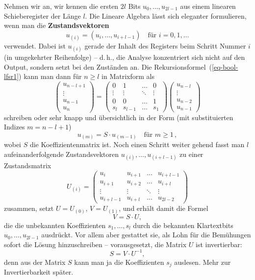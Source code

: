 \begin{refsegment}
Nehmen wir an, wir kennen die ersten $2l$ Bits $u_0, \ldots, u_{2l-1}$
aus einem linearen Schieberegister
der Länge $l$. Die Lineare Algebra lässt
sich eleganter formulieren, wenn man die \textbf{Zustandsvektoren}
\[
     u_{(i)} = (u_i, \ldots, u_{i+l-1}) \quad \text{für } i = 0, 1, \ldots
\]
verwendet. Dabei ist $u_{(i)}$ gerade der Inhalt des Registers beim Schritt
Nummer $i$ (in umgekehrter Reihenfolge) -- d.\,h., die Analyse konzentriert
sich nicht auf den Output, sondern setzt bei den Zuständen an. Die
Rekursionsformel~(\ref{eq-bool-lfsr1}) kann man dann für $n \geq l$ in
Matrixform als
\[
     \begin{pmatrix} u_{n-l+1} \\ \vdots \\ u_{n-1} \\ u_{n} \end{pmatrix}
     =
     \begin{pmatrix} 0      & 1      & \ldots & 0      \\
                     \vdots & \vdots & \ddots & \vdots \\
                     0      & 0      & \ldots & 1      \\
                     s_l    & s_{l-1}    & \ldots & s_1 \end{pmatrix}
     \begin{pmatrix} u_{n-l} \\ \vdots \\ u_{n-2} \\ u_{n-1} \end{pmatrix}
\]
schreiben oder sehr knapp und übersichtlich in der Form (mit substituierten Indizes
$m = n-l+1$)
\[
     u_{(m)} = S \cdot u_{(m-1)} \quad \text{für } m \geq 1\,,
\]
wobei $S$ die Koeffizientenmatrix ist. Noch einen Schritt weiter gehend
fasst man $l$ aufeinanderfolgende Zustandsvektoren
$u_{(i)}, \ldots, u_{(i+l-1)}$ zu einer Zustandsmatrix
\[
     U_{(i)} = \begin{pmatrix} u_i      & u_{i+1}      & \ldots & u_{i+l-1}      \\
                               u_{i+1} & u_{i+2} & \ldots & u_{i+l} \\
                               \vdots  & \vdots & \ddots & \vdots     \\
                     u_{i+l-1}    & u_{i+l} & \ldots & u_{2l-2} \end{pmatrix}
\]
zusammen, setzt $U = U_{(0)}$, $V = U_{(1)}$, und erhält damit die Formel
\[
     V  =  S \cdot U,
\]
die die unbekannten Koeffizienten $s_1, \ldots, s_l$ durch die bekannten
Klartextbits $u_0, \ldots, u_{2l-1}$ ausdrückt. Vor allem aber gestattet sie,
als Lohn für die Bemühungen sofort die Lösung hinzuschreiben -- vorausgesetzt,
die Matrix $U$ ist invertierbar:
\[
     S  =  V \cdot U^{-1},
\]
denn aus der Matrix $S$ kann man ja die Koeffizienten $s_j$ auslesen.
Mehr zur Invertierbarkeit später.


\end{refsegment}
